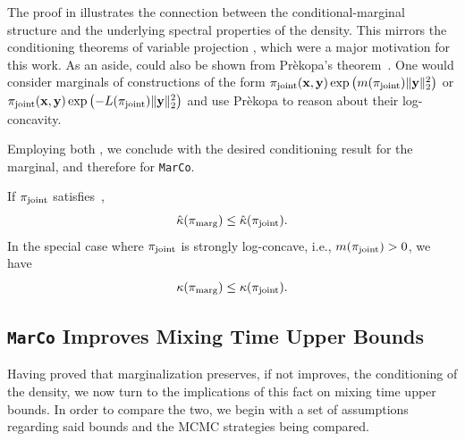 \documentclass[onefignum,onetabnum]{siamonline250211}
\newcommand{\isocond}{\hat\kappa}
\newcommand{\bfx}{{\bf x}}
\newcommand{\bfy}{{\bf y}}
\newcommand{\pjoint}{\pi_{\rm joint}}
\newcommand{\pmarg}{\pi_{\rm marg}}
\newcommand{\MarCo}{\textnormal{\texttt{MarCo}}\xspace}
\begin{document}
%
    The proof in  illustrates the connection between the conditional-marginal structure and the underlying spectral properties of the density.
    This mirrors the conditioning theorems of variable projection \cite{chowdhary_boost_2026,newman_train_2021}, which were a major motivation for this work.
    As an aside,  could also be shown from Pr\`{e}kopa's theorem~\cite[Theorem 6]{prekopa_logarithmic_1973}.
    One would consider marginals of constructions of the form $\pjoint(\bfx,\bfy)\exp\left( m(\pjoint) \|\bfy\|_2^2\right)$ or $\pjoint(\bfx,\bfy)\exp\left( -L(\pjoint) \|\bfy\|_2^2\right)$ and use Pr\`{e}kopa to reason about their log-concavity.
%


%
%


%
%
%
%
%
%
%
%
%
%

%
%
%
%
%
%
%
%
%
%
%
%
%
%
%
%
%
%
%
%
%
%
%
%
%
%
%
%
%

Employing both , we conclude with the desired conditioning result for the marginal, and therefore for \MarCo.

\begin{corollary}
  \label{cor:marginal-isocond}
  If $\pjoint$ satisfies~,
  \begin{equation}
    \label{eq:marginal-isoperimetric-condition-number}
    \isocond(\pmarg) \leq \isocond(\pjoint).
  \end{equation}
In the special case where $\pjoint$ is strongly log-concave, i.e., $m(\pjoint) > 0$, we have
  \begin{equation}
  \label{eq:ineq_kappa_pi}
    \kappa(\pmarg) \leq \kappa(\pjoint).
  \end{equation}
\end{corollary}


\subsection{\MarCo Improves Mixing Time Upper Bounds}
\label{sec:spectral_consequences}
Having proved that marginalization preserves, if not improves, the conditioning of the density, we now turn to the implications of this fact on mixing time upper bounds.
In order to compare the two, we begin with a set of assumptions regarding said bounds and the MCMC strategies being compared.
%
%
%
%
\end{document}
